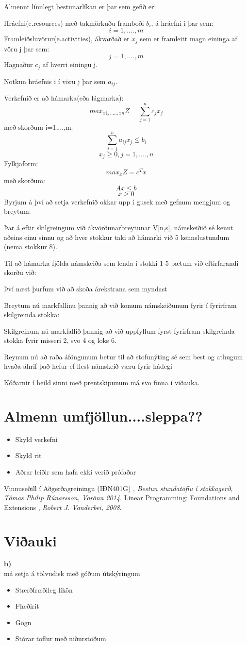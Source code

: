 \documentclass[a4paper,12pt]{article}
\begin{document}
Almennt línulegt bestunarlíkan er þar sem gefið er:

Hráefni(e.resources) með takmörkuðu framboði  $b_i$, á hráefni i þar sem:
\[i=1,....,m\]
Framleiðsluvörur(e.activities), ákvarðað er $x_j$ sem er framleitt magn eininga af vöru j þar sem:
\[j=1,....,m\]
Hagnaður $c_j$ af hverri einingu j. 

Notkun hráefnis i í vöru j þar sem $a_{ij}$.

Verkefnið er að hámarka(eða lágmarka):
\[max_{x1,.....,xn}Z = \sum_{j=1}^{n}c_j x_j\]
með skorðum i=1,...,m.
\[\sum_{j=1}^{n}a_{ij} x_j\leq b_i\]
\[x_j\geq 0, j=1,....,n\]
Fylkjaform:
\[max_xZ=c^Tx\]
með skorðum:
\[Ax\leq b\]
\[x\geq 0\]
Byrjum á því að setja verkefnið okkar upp í gusek með gefnum mengjum og breytum:

Þar á eftir skilgreingum við ákvörðunarbreytunar V[n,s], námskeiðið sé kennt aðeins einu sinnu og að 
hver stokkur taki að hámarki við 5 kennslustundum (nema stokkur 8).


Til að hámarka fjölda námskeiða sem lenda í stokki 1-5 bætum við eftirfarandi skorðu við:

Því næst þurfum við að skoða árekstrana sem myndast

Breytum nú markfallinu þannig að við komum námskeiðunum fyrir í fyrirfram skilgreinda stokka:

Skilgreinum nú markfallið þannig að við uppfyllum fyrst fyrirfram skilgreinda stokka fyrir misseri 2, svo 4 og loks 6.

Reynum nú að raða áföngunum betur til að stofunýting sé sem best og athugum hvaða áhrif það hefur ef flest námskeið væru fyrir hádegi


Kóðarnir í heild sinni með prentskipunum má svo finna í viðauka.

\section{Almenn umfjöllun....sleppa??}
\begin{itemize}
\item Skyld verkefni
\item Skyld rit
\item Aðrar leiðir sem hafa ekki verið prófaðar
\end{itemize}




\pagebreak

\begin{thebibliography}{2}
	 Vinnuseðill í Aðgerðagreiningu (IÐN401G) , \textit{Bestun stundatöflu í stokkagerð, Tómas Philip Rúnarsson, Vorönn 2014}. 
	 Linear Programming: Foundations and Extensions , \textit{Robert J. Vanderbei, 2008}. 
\end{thebibliography}


\pagebreak
\section{Viðauki}
\textbf{b)} \\


má setja á tölvudisk með góðum útskýringum
\begin{itemize}
\item Stærðfræðileg líkön
\item Flæðirit
\item Gögn
\item Stórar töflur með niðurstöðum
\end{itemize}
\end{document}

